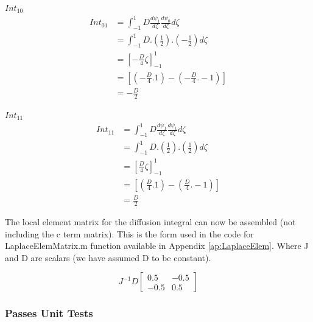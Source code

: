 \documentclass[11pt]{article}
\begin{document}
\pagebreak

\underline{$Int_{10}$} \\


\begin{equation}\label{eq:Int10}
\begin{split}
 Int_{01} &= \int_{-1}^{1} D \frac{d\psi_{1}}{d\zeta} \frac{d\psi_{0}}{d \zeta} d \zeta \\
&=  \int_{-1}^{1} D .( \frac{1}{2}). (-\frac{1}{2}) d\zeta \\
& = \left[-\frac{D}{4} \zeta \right]_{-1}^{1} \\
& = \left[ (-\frac{D}{4}.1) - (-\frac{D}{4}.-1) \right] \\
& = -\frac{D}{2}
\end{split}
\end{equation}

\underline{$Int_{11}$} \\


\begin{equation}\label{eq:Int11}
\begin{split}
 Int_{11} &= \int_{-1}^{1} D \frac{d\psi_{1}}{d\zeta} \frac{d\psi_{1}}{d \zeta} d \zeta \\
&=  \int_{-1}^{1} D .( \frac{1}{2}). (\frac{1}{2}) d\zeta \\
& = \left [\frac{D}{4} \zeta \right ]_{-1}^{1} \\
& = \left [ (\frac{D}{4}.1) - (\frac{D}{4}.-1) \right ] \\
& = \frac{D}{2}
\end{split}
\end{equation}

The local element matrix for the diffusion integral can now be assembled (not including the c term matrix). This is the form used in the code for LaplaceElemMatrix.m function available in Appendix \ref{ap:LaplaceElem}. Where J and D are scalars (we have assumed D to be constant).

\begin{equation} \label{eq:diffmatrix}
J^{-1}D
\begin{bmatrix}

0.5 & -0.5 \\
-0.5 & 0.5
\end{bmatrix}
\end{equation}

\pagebreak
\subsubsection{Passes Unit Tests}
\end{document}

